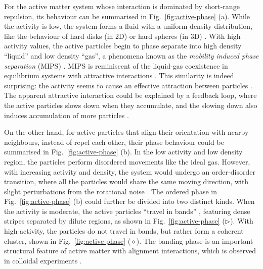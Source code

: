 \documentclass[11pt,twoside]{report}
\begin{document}
For the active matter system whose interaction is dominated by short-range repulsion, its behaviour can be summarised in Fig.~\ref{fig:active-phase} (a). While the activity is low, the system forms a fluid with a uniform density distribution, like the behaviour of hard disks (in 2D) \cite{krauth2006, klamser2018, stenhammar2014} or hard spheres (in 3D) \cite{stenhammar2014, robinson2019, turci2021}. 
With high activity values, the active particles begin to phase separate into high density ``liquid'' and low density ``gas'', a phenomena known as the \emph{mobility induced phase separation} (\gls{MIPS}) \cite{fily2012, cates2015, digregorio2018, turci2021}. MIPS is reminiscent of the liquid-gas coexistence in equilibrium systems with attractive interactions \cite{hansen1969, speck2016, anderson2017}. This similarity is indeed surprising: the activity seems to cause an effective attraction between particles \cite{turci2021}. The apparent attractive interaction could be explained by a feedback loop, where the active particles slows down when they accumulate, and the slowing down also induces accumulation of more particles \cite{cates2015}.

On the other hand, for active particles that align their orientation with nearby neighbours, instead of repel each other, their phase behaviour could be summarised in Fig.~\ref{fig:active-phase} (b). In the low activity and low density region, the particles perform disordered movements like the ideal gas. However, with increasing activity and density, the system would undergo an order-disorder transition, where all the particles would share the same moving direction, with slight perturbations from the rotational noise \cite{vicsek1995, solon2015}.
The ordered phase in Fig.~\ref{fig:active-phase} (b) could further be divided into two distinct kinds. When the activity is moderate, the active particles ``travel in bands'' \cite{chate2008}, featuring dense stripes separated by dilute regions, as shown in Fig.~\ref{fig:active-phase} ($\triangleright$). With high activity, the particles do not travel in bands, but rather form a coherent cluster, shown in Fig.~\ref{fig:active-phase} ($\diamond$). The banding phase is an important structural feature of active matter with alignment interactions, which is observed in colloidal experiments \cite{bricard2013, geyer2018, mauleon-amieva2020}.
\end{document}
